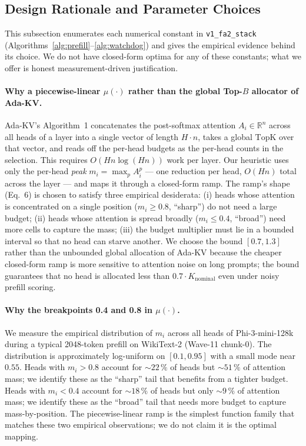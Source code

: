 \documentclass[sigconf, anonymous=false, screen=true]{acmart}
\begin{document}
\subsection{Design Rationale and Parameter Choices}
\label{sec:design-rationale}

This subsection enumerates each numerical constant in \texttt{v1\_fa2\_stack} (Algorithms~\ref{alg:prefill}--\ref{alg:watchdog}) and gives the empirical evidence behind its choice. We do not have closed-form optima for any of these constants; what we offer is honest measurement-driven justification.

\paragraph{Why a piecewise-linear $\mu(\cdot)$ rather than the global Top-$B$ allocator of Ada-KV.}
Ada-KV's Algorithm~1 concatenates the post-softmax attention $A_i \in \mathbb{R}^n$ across all heads of a layer into a single vector of length $H \cdot n$, takes a global $\mathrm{TopK}$ over that vector, and reads off the per-head budgets as the per-head counts in the selection. This requires $O(H n \log(Hn))$ work per layer. Our heuristic uses only the per-head \emph{peak} $m_i = \max_p A_i^p$ --- one reduction per head, $O(H n)$ total across the layer --- and maps it through a closed-form ramp. The ramp's shape (Eq.~6) is chosen to satisfy three empirical desiderata: (i) heads whose attention is concentrated on a single position ($m_i \ge 0.8$, ``sharp'') do not need a large budget; (ii) heads whose attention is spread broadly ($m_i \le 0.4$, ``broad'') need more cells to capture the mass; (iii) the budget multiplier must lie in a bounded interval so that no head can starve another. We choose the bound $[0.7, 1.3]$ rather than the unbounded global allocation of Ada-KV because the cheaper closed-form ramp is more sensitive to attention noise on long prompts; the bound guarantees that no head is allocated less than $0.7 \cdot K_{\text{nominal}}$ even under noisy prefill scoring.

\paragraph{Why the breakpoints 0.4 and 0.8 in $\mu(\cdot)$.}
We measure the empirical distribution of $m_i$ across all heads of Phi-3-mini-128k during a typical 2048-token prefill on WikiText-2 (Wave-11 chunk-0). The distribution is approximately log-uniform on $[0.1, 0.95]$ with a small mode near $0.55$. Heads with $m_i > 0.8$ account for $\sim 22\,\%$ of heads but $\sim 51\,\%$ of attention mass; we identify these as the ``sharp'' tail that benefits from a tighter budget. Heads with $m_i < 0.4$ account for $\sim 18\,\%$ of heads but only $\sim 9\,\%$ of attention mass; we identify these as the ``broad'' tail that needs more budget to capture mass-by-position. The piecewise-linear ramp is the simplest function family that matches these two empirical observations; we do not claim it is the optimal mapping.
\end{document}

